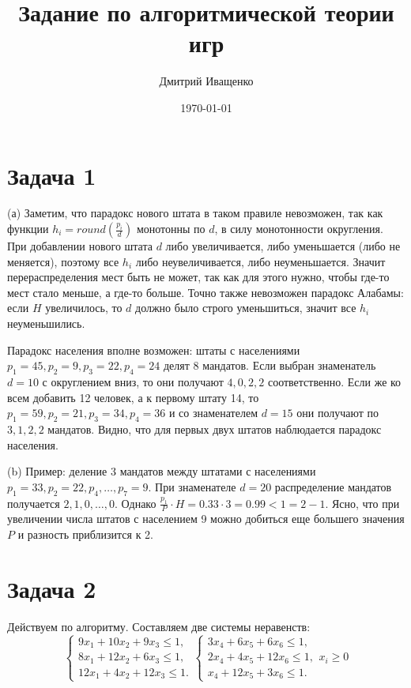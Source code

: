 \documentclass{article}
\theoremstyle{definition}
\theoremstyle{remark}
\renewcommand{\le}{\leqslant}
\renewcommand{\ge}{\geqslant}
\begin{document}
\title{Задание по алгоритмической теории игр}
\author{Дмитрий Иващенко}
\date{\today}
\maketitle

\section*{Задача 1}

(а) Заметим, что парадокс нового штата в таком правиле невозможен, так как функции $h_i =
round\left(\frac{p_i}{d}\right)$ монотонны по $d$, в силу монотонности округления. При добавлении
нового штата $d$ либо увеличивается, либо уменьшается (либо не меняется), поэтому все $h_i$ либо
неувеличивается, либо неуменьшается. Значит перераспределения мест быть не может, так как для этого
нужно, чтобы где-то мест стало меньше, а где-то больше. Точно также невозможен парадокс Алабамы:
если $H$ увеличилось, то $d$ должно было строго уменьшиться, значит все $h_i$ неуменьшились.

Парадокс населения вполне возможен: штаты с населениями $p_1 = 45, p_2 = 9, p_3 = 22, p_4 = 24$
делят 8 мандатов. Если выбран знаменатель $d = 10$ с округлением вниз, то они получают $4, 0, 2, 2$
соответственно. Если же ко всем добавить 12 человек, а к первому штату 14, то $p_1 = 59, p_2 = 21,
p_3 = 34, p_4 = 36$ и со знаменателем $d = 15$ они получают по $3, 1, 2, 2$ мандатов. Видно, что для
первых двух штатов наблюдается парадокс населения.

(b) Пример: деление 3 мандатов между штатами с населениями $p_1 = 33, p_2 = 22, p_4, \ldots, p_7 =
9$. При знаменателе $d = 20$ распределение мандатов получается $2, 1, 0, \ldots, 0$. Однако
$\frac{p_1}{P} \cdot H = 0.33 \cdot 3 = 0.99 < 1 = 2 - 1$. Ясно, что при увеличении числа штатов с
населением 9 можно добиться еще большего значения $P$ и разность приблизится к 2.

\section*{Задача 2}

Действуем по алгоритму. Составляем две системы неравенств:
$$
\begin{cases}
	9x_1 + 10x_2 + 9x_3 \le 1,\\
	8x_1 + 12x_2 + 6x_3 \le 1,\\
	12x_1 + 4x_2 + 12x_3 \le 1.
\end{cases}
\begin{cases}
	3x_4 + 6x_5 + 6x_6 \le 1,\\
	2x_4 + 4x_5 + 12x_6 \le 1,\\
	x_4 + 12x_5 + 3x_6 \le 1.
\end{cases}
x_i \ge 0
$$
\end{document}
